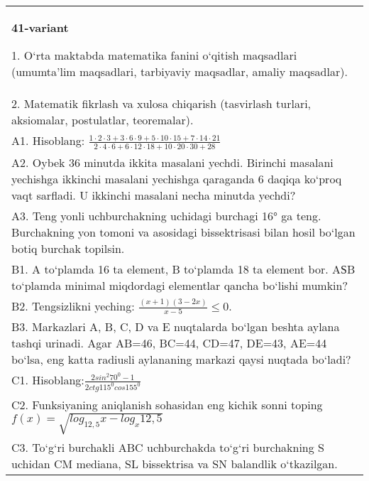 \documentclass{article}
\begin{document}
\begin{tabular}{m{17cm}}
\textbf{41-variant}

1. O‘rta maktabda matematika fanini o‘qitish maqsadlari (umumta’lim maqsadlari, tarbiyaviy maqsadlar, amaliy maqsadlar). \\
2. Matematik fikrlash va xulosa chiqarish (tasvirlash turlari, aksiomalar, postulatlar, teoremalar). \\
A1. Hisoblang: \(\frac{1 \cdot 2 \cdot 3 + 3 \cdot 6 \cdot 9 + 5 \cdot 10 \cdot 15 + 7 \cdot 14 \cdot 21}{2 \cdot 4 \cdot 6 + 6 \cdot 12 \cdot 18 + 10 \cdot 20 \cdot 30 + 28}\) \\
A2. Oybek 36 minutda ikkita masalani yechdi. Birinchi masalani yechishga ikkinchi masalani yechishga qaraganda 6 daqiqa ko‘proq vaqt sarfladi. U ikkinchi masalani necha minutda yechdi? \\
A3. Teng yonli uchburchakning uchidagi burchagi 16° ga teng. Burchakning yon tomoni va asosidagi bissektrisasi bilan hosil bo‘lgan botiq burchak topilsin. \\
B1. A to‘plamda 16 ta element, B to‘plamda 18 ta element bor. AЅB to‘plamda minimal miqdordagi elementlar qancha bo‘lishi mumkin? \\
B2. Tengsizlikni yeching: \(\frac{ (x + 1) (3 - 2x) }{x - 5} \leq 0\). \\
B3. Markazlari A, B, C, D va E nuqtalarda bo‘lgan beshta aylana tashqi urinadi. Agar AB=46, BC=44, CD=47, DE=43, AE=44 bo‘lsa, eng katta radiusli aylananing markazi qaysi nuqtada bo‘ladi? \\
C1. Hisoblang:\(\frac{2sin^{2}70^{0} - 1}{2ctg115^{0}cos155^{0}}\) \\
C2. Funksiyaning aniqlanish sohasidan eng kichik sonni toping \(f (x) = \sqrt{log_{12,5}x - log_{x}12,5}\) \\
C3. To‘g‘ri burchakli ABC uchburchakda to‘g‘ri burchakning S uchidan CM mediana, SL bissektrisa va SN balandlik o‘tkazilgan. \\

\end{tabular}
\vspace{1cm}
\end{document}
